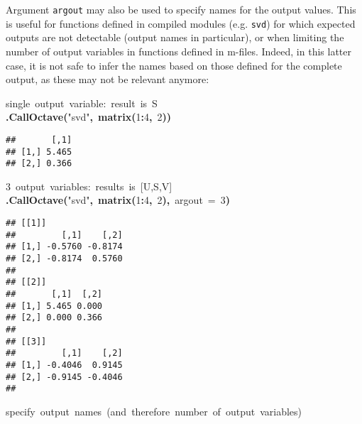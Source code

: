 \documentclass[english,10pt,a4paper]{article}\usepackage{graphicx, color}
\makeatletter
\newcommand{\hlnumber}[1]{\textcolor[rgb]{0,0,0}{#1}}%
\newcommand{\hlfunctioncall}[1]{\textcolor[rgb]{0.501960784313725,0,0.329411764705882}{\textbf{#1}}}%
\newcommand{\hlstring}[1]{\textcolor[rgb]{0.6,0.6,1}{#1}}%
\newcommand{\hlkeyword}[1]{\textcolor[rgb]{0,0,0}{\textbf{#1}}}%
\newcommand{\hlargument}[1]{\textcolor[rgb]{0.690196078431373,0.250980392156863,0.0196078431372549}{#1}}%
\newcommand{\hlcomment}[1]{\textcolor[rgb]{0.180392156862745,0.6,0.341176470588235}{#1}}%
\newcommand{\hlstd}[1]{\textcolor[rgb]{0,0,0}{#1}}%
\newenvironment{kframe}{%
 \def\FrameCommand##1{\hskip\@totalleftmargin \hskip-\fboxsep
 \colorbox{shadecolor}{##1}\hskip-\fboxsep
     \hskip-\linewidth \hskip-\@totalleftmargin \hskip\columnwidth}%
 \MakeFramed {\advance\hsize-\width
   \@totalleftmargin\z@ \linewidth\hsize
   \@setminipage}}%
 {\par\unskip\endMakeFramed}
\newenvironment{knitrout}{}{} %
\let\code=\texttt
\makeatother
\begin{document}
Argument \code{argout} may also be used to specify names for the output values.
This is useful for functions defined in compiled modules (e.g. \code{svd}) for
which expected outputs are not detectable (output names in particular), or when
limiting the number of output variables in functions defined in m-files.
Indeed, in this latter case, it is not safe to infer the names based on those
defined for the complete output, as these may not be relevant anymore:

\begin{knitrout}
\color{fgcolor}\begin{kframe}
\begin{flushleft}
\ttfamily\noindent
\hlcomment{\usebox{\hlnormalsizeboxhash}{\ }single{\ }output{\ }variable:{\ }result{\ }is{\ }S}\hspace*{\fill}\\
\hlstd{}\hlfunctioncall{.CallOctave}\hlkeyword{(}\hlstring{"{}svd"{}}\hlkeyword{,}{\ }\hlfunctioncall{matrix}\hlkeyword{(}\hlnumber{1}\hlkeyword{:}\hlnumber{4}\hlkeyword{,}{\ }\hlnumber{2}\hlkeyword{)}\hlkeyword{)}\mbox{}
\normalfont
\end{flushleft}
\begin{verbatim}
##       [,1]
## [1,] 5.465
## [2,] 0.366
\end{verbatim}
\begin{flushleft}
\ttfamily\noindent
\hlcomment{\usebox{\hlnormalsizeboxhash}{\ }3{\ }output{\ }variables:{\ }results{\ }is{\ }[U,S,V]}\hspace*{\fill}\\
\hlstd{}\hlfunctioncall{.CallOctave}\hlkeyword{(}\hlstring{"{}svd"{}}\hlkeyword{,}{\ }\hlfunctioncall{matrix}\hlkeyword{(}\hlnumber{1}\hlkeyword{:}\hlnumber{4}\hlkeyword{,}{\ }\hlnumber{2}\hlkeyword{)}\hlkeyword{,}{\ }\hlargument{argout}{\ }\hlargument{=}{\ }\hlnumber{3}\hlkeyword{)}\mbox{}
\normalfont
\end{flushleft}
\begin{verbatim}
## [[1]]
##         [,1]    [,2]
## [1,] -0.5760 -0.8174
## [2,] -0.8174  0.5760
## 
## [[2]]
##       [,1]  [,2]
## [1,] 5.465 0.000
## [2,] 0.000 0.366
## 
## [[3]]
##         [,1]    [,2]
## [1,] -0.4046  0.9145
## [2,] -0.9145 -0.4046
## 
\end{verbatim}
\begin{flushleft}
\ttfamily\noindent
\hlcomment{\usebox{\hlnormalsizeboxhash}{\ }specify{\ }output{\ }names{\ }(and{\ }therefore{\ }number{\ }of{\ }output{\ }variables)}\hspace*{\fill}\\

\end{flushleft}
\end{kframe}
\end{knitrout}
\end{document}
